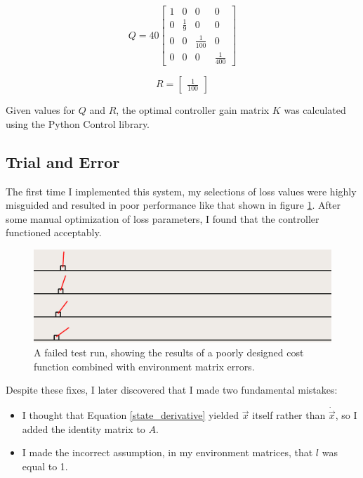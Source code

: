 \documentclass[11pt]{article}
\begin{document}
\begin{equation}
    Q = 40 \begin{bmatrix}
        1 & 0 & 0 & 0 \\
        0 & \frac{1}{9} & 0 & 0 \\
        0 & 0 & \frac{1}{100} & 0 \\
        0 & 0 & 0 & \frac{1}{400}
    \end{bmatrix}
\end{equation}

\begin{equation}
    R = \begin{bmatrix}
        \displaystyle
        \frac{1}{100}
    \end{bmatrix}
\end{equation}

Given values for $Q$ and $R$, the optimal controller gain matrix $K$ was calculated using the Python Control library.

\subsection{Trial and Error}

The first time I implemented this system, my selections of loss values were highly misguided and resulted in poor performance like that shown in figure \ref{fail}. After some manual optimization of loss parameters, I found that the controller functioned acceptably.

\begin{figure}[ht]
    \centering
    \includegraphics[width=\textwidth]{fail}
    \caption{\label{fail} A failed test run, showing the results of a poorly designed cost function combined with environment matrix errors.}
\end{figure}

Despite these fixes, I later discovered that I made two fundamental mistakes:

\begin{itemize}
    \item I thought that Equation \ref{state_derivative} yielded $\vec{x}$ itself rather than $\dot{\vec{x}}$, so I added the identity matrix to $A$.
    \item I made the incorrect assumption, in my environment matrices, that $l$ was equal to 1.
\end{itemize}
\end{document}
